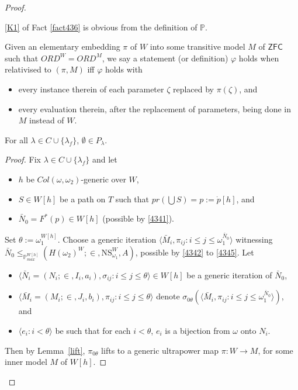\documentclass[12pt]{article}
\numberwithin{equation}{section}
\begin{document}
\begin{proof}
\begin{rem}\label{rem447}
\ref{K1} of Fact \ref{fact436} is obvious from the definition of $\mathbb{P}$.
\end{rem}

\begin{con}
Given an elementary embedding $\pi$ of $W$ into some transitive model $M$ of $\mathsf{ZFC}$ such that $ORD^W = ORD^M$, we say a statement (or definition) $\varphi$ holds when relativised to $(\pi, M)$ iff $\varphi$ holds with
\begin{itemize}
    \item every instance therein of each parameter $\zeta$ replaced by $\pi(\zeta)$, and
    \item every evaluation therein, after the replacement of parameters, being done in $M$ instead of $W$.
\end{itemize}
\end{con}

\begin{lem}\label{nonemp2}
For all $\lambda \in C \cup \{\lambda_f\}$, $\emptyset \in P_{\lambda}$.
\end{lem}

\begin{proof}
Fix $\lambda \in C \cup \{\lambda_f\}$ and let 
\begin{itemize}
    \item $h$ be $Col(\omega, \omega_2)$-generic over $W$,
    \item $S \in W[h]$ be a path on $T$ such that $pr(\bigcup S) = p := \dot{p}[h]$, and
    \item $\bar{N}_0 = F^*(p) \in W[h]$ (possible by \ref{4341}).
\end{itemize}
Set $\theta := \omega_1^{W[h]}$. Choose a generic iteration $\langle \bar{M}_i, \pi_{ij} : i \leq j \leq \omega_1^{\bar{N}_0} \rangle$ witnessing $\bar{N}_0 \leq_{\mathbb{P}^{W[h]}_{max}} (H(\omega_2)^W; \in, \mathrm{NS}_{\omega_1}^W, A)$, possible by \ref{4342} to \ref{4345}. Let 
\begin{itemize}
    \item $\langle \bar{N}_i = (N_i; \in, I_i, a_i), \sigma_{ij} : i \leq j \leq \theta \rangle \in W[h]$ be a generic iteration of $\bar{N}_0$,
    \item $\langle \bar{M}_i = (M_i; \in, J_i, b_i), \pi_{ij} : i \leq j \leq \theta \rangle$ denote $\sigma_{0\theta}(\langle \bar{M}_i, \pi_{ij} : i \leq j \leq \omega_1^{\bar{N}_0} \rangle)$, and
    \item $\langle e_i : i < \theta \rangle$ be such that for each $i < \theta$, $e_i$ is a bijection from $\omega$ onto $N_i$.
\end{itemize}
Then by Lemma~\ref{lift}, $\pi_{0\theta}$ lifts to a generic ultrapower map $\pi : W \longrightarrow M$, for some inner model $M$ of $W[h]$. 


\end{proof}
\end{proof}
\end{document}
